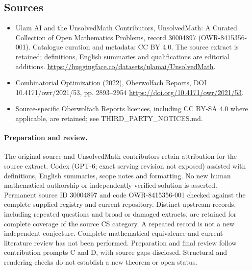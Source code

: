 \documentclass[11pt]{article}
\begin{document}
\subsection{Sources}
\begin{itemize}
\item[\hypertarget{source:30004897:1}{S1}] Ulam AI and the UnsolvedMath Contributors, UnsolvedMath: A Curated Collection of Open Mathematics Problems, record 30004897 (OWR-8415356-001). Catalogue curation and metadata: CC BY 4.0. The source extract is retained; definitions, English summaries and qualifications are editorial additions.
\url{https://huggingface.co/datasets/ulamai/UnsolvedMath}.
\item[\hypertarget{source:30004897:2}{S2}] Combinatorial Optimization (2022), Oberwolfach Reports, DOI 10.4171/owr/2021/53, pp. 2893--2954
\url{https://doi.org/10.4171/owr/2021/53}.
\item Source-specific Oberwolfach Reports licences, including CC BY-SA 4.0 where applicable, are retained; see THIRD\_PARTY\_NOTICES.md.
\end{itemize}
\paragraph{Preparation and review.}
The original source and UnsolvedMath contributors retain attribution for the source extract. Codex (GPT-6; exact serving revision not exposed) assisted with definitions, English summaries, scope notes and formatting. No new human mathematical authorship or independently verified solution is asserted. Permanent source ID 30004897 and code OWR-8415356-001 checked against the complete supplied registry and current repository. Distinct upstream records, including repeated questions and broad or damaged extracts, are retained for complete coverage of the source CS category. A repeated record is not a new independent conjecture. Complete mathematical-equivalence and current-literature review has not been performed. Preparation and final review follow contribution prompts C and D, with source gaps disclosed. Structural and rendering checks do not establish a new theorem or open status.
\label{end:30004897}
\end{document}
